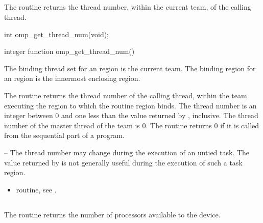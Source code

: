 \subsection{}
\label{subsec:omp_get_thread_num}
\summary
The  routine returns the thread number, within the current 
team, of the calling thread.

\format
\ccppspecificstart
\begin{boxedcode}
int omp\_get\_thread\_num(void); 
\end{boxedcode}
\ccppspecificend

\fortranspecificstart
\begin{boxedcode}
integer function omp\_get\_thread\_num() 
\end{boxedcode}
\fortranspecificend

\binding
The binding thread set for an  region is the current team. The 
binding region for an  region is the innermost enclosing 
 region. 

\effect
The  routine returns the thread number of the calling thread, 
within the team executing the  region to which the routine region binds. The 
thread number is an integer between 0 and one less than the value returned by 
, inclusive. The thread number of the master thread of the 
team is 0. The routine returns 0 if it is called from the sequential part of a program.

\notestart
\noteheader – The thread number may change during the execution of an untied task. The 
value returned by  is not generally useful during the execution 
of such a task region.
\noteend

\crossreferences
\begin{itemize}
\item {} routine, see 
.
\end{itemize}








\subsection{}
\label{subsec:omp_get_num_procs}
\summary
The  routine returns the number of processors available to the 
device.

